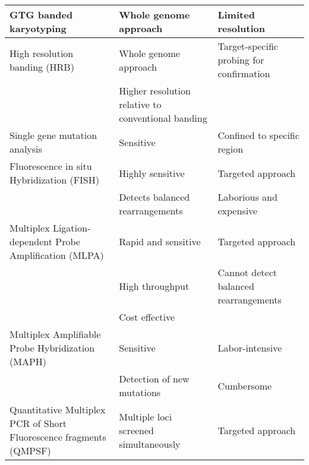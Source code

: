 \begin{longtable}{p{} p{} p{}}
	GTG banded karyotyping                                             & Whole genome approach                              & Limited resolution                       \\* \midrule
	High resolution banding (HRB)                                      & Whole genome approach                              & Target-specific probing for confirmation \\* \midrule
                                                                       & Higher resolution relative to conventional banding &                                          \\* %
	Single gene mutation analysis                                      & Sensitive                                          & Confined to specific region              \\* \midrule
	Fluorescence in situ Hybridization (FISH)                          & Highly sensitive                                   & Targeted approach                        \\* %
                                                                       & Detects balanced rearrangements                    & Laborious and expensive                  \\* \midrule
	Multiplex Ligation-dependent Probe Amplification (MLPA)            & Rapid and sensitive                                & Targeted approach                        \\* %
                                                                       & High throughput                                    & Cannot detect balanced rearrangements    \\* %
                                                                       & Cost effective                                     &                                          \\* \midrule
	Multiplex Amplifiable Probe Hybridization (MAPH)                   & Sensitive                                          & Labor-intensive                          \\* %
                                                                       & Detection of new mutations                         & Cumbersome                               \\* \midrule
	Quantitative Multiplex PCR of Short Fluorescence fragments (QMPSF) & Multiple loci screened simultaneously              & Targeted approach                        \\* %

\end{longtable}
